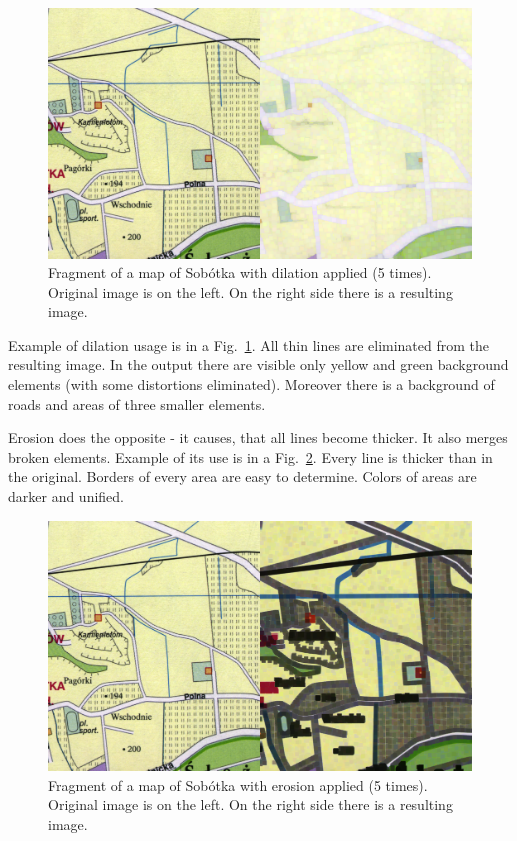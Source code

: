 \documentclass[a4paper,onecolumn,oneside,12pt]{memoir}
\begin{document}
\begin{figure}[!ht]
\begin{center}
\includegraphics[scale=1.0]{images/dilationResult.png}
\caption{Fragment of a map of Sobótka with dilation applied (5 times). \\
Original image is on the left. On the right side there is a resulting image.}
\label{dilationResult}
\end{center}
\end{figure}

Example of dilation usage is in a Fig.~\ref{dilationResult}. All thin lines are eliminated from the
resulting image. In the output there are visible only yellow and green background elements (with some
distortions eliminated). Moreover there is a background of roads and areas of three smaller elements.

Erosion does the opposite - it causes, that all lines become thicker. It also merges broken
elements. Example of its use is in a Fig.~\ref{erosionResult}. Every line is thicker than in the
original. Borders of every area are easy to determine. Colors of areas are darker and unified.

\begin{figure}[!ht]
\begin{center}
\includegraphics[scale=1.0]{images/erosionResult.png}
\caption{Fragment of a map of Sobótka with erosion applied (5 times). Original image is on the left.
On the right side there is a resulting image.}
\label{erosionResult}
\end{center}
\end{figure}
\end{document}
